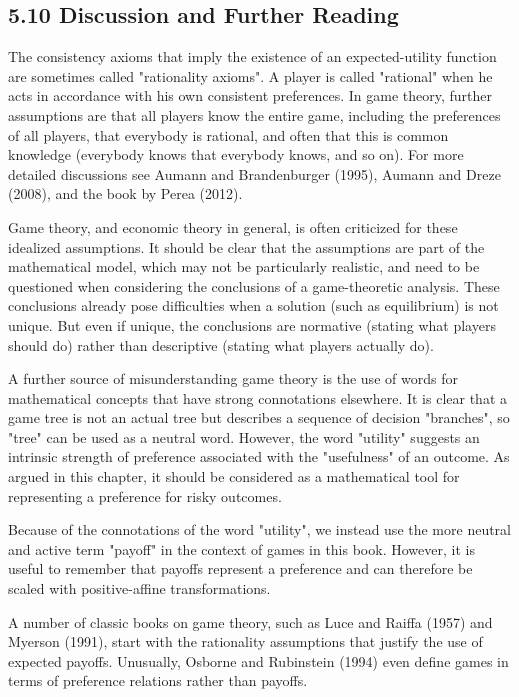 \documentclass[12pt]{article}
\begin{document}
\subsection*{5.10 Discussion and Further Reading}
The consistency axioms that imply the existence of an expected-utility function are sometimes called "rationality axioms". A player is called "rational" when he acts in accordance with his own consistent preferences. In game theory, further assumptions are that all players know the entire game, including the preferences of all players, that everybody is rational, and often that this is common knowledge (everybody knows that everybody knows, and so on). For more detailed discussions see Aumann and Brandenburger (1995), Aumann and Dreze (2008), and the book by Perea (2012).

Game theory, and economic theory in general, is often criticized for these idealized assumptions. It should be clear that the assumptions are part of the mathematical model, which may not be particularly realistic, and need to be questioned when considering the conclusions of a game-theoretic analysis. These conclusions already pose difficulties when a solution (such as equilibrium) is not\\
unique. But even if unique, the conclusions are normative (stating what players should do) rather than descriptive (stating what players actually do).

A further source of misunderstanding game theory is the use of words for mathematical concepts that have strong connotations elsewhere. It is clear that a game tree is not an actual tree but describes a sequence of decision "branches", so "tree" can be used as a neutral word. However, the word "utility" suggests an intrinsic strength of preference associated with the "usefulness" of an outcome. As argued in this chapter, it should be considered as a mathematical tool for representing a preference for risky outcomes.

Because of the connotations of the word "utility", we instead use the more neutral and active term "payoff" in the context of games in this book. However, it is useful to remember that payoffs represent a preference and can therefore be scaled with positive-affine transformations.

A number of classic books on game theory, such as Luce and Raiffa (1957) and Myerson (1991), start with the rationality assumptions that justify the use of expected payoffs. Unusually, Osborne and Rubinstein (1994) even define games in terms of preference relations rather than payoffs.
\end{document}
